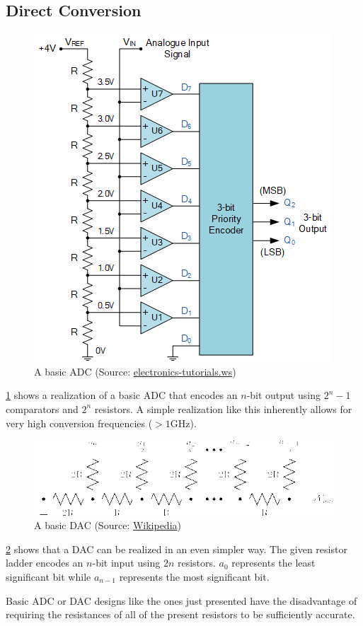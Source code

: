\documentclass{report}
\newcommand*{\newpar}{\par\vspace{\baselineskip}\noindent} %
\begin{document}
\subsection{Direct Conversion}
\begin{figure}[h!]
\centering
\includegraphics[scale=2]{figures/ADC}
\caption{A basic ADC (Source: \href{https://www.electronics-tutorials.ws/combination/analogue-to-digital-converter.html}{electronics-tutorials.ws})}
\label{fig:ADC}
\end{figure}
\ref{fig:ADC} shows a realization of a basic ADC that encodes an $n$-bit output using $2^n - 1$ comparators and $2^n$ resistors. A simple realization like this inherently allows for very high conversion frequencies ($> 1$GHz).
\begin{figure}[h!]
\centering
\includegraphics[scale=0.5]{figures/DAC}
\caption{A basic DAC (Source: \href{https://en.wikipedia.org/wiki/File:R2r-ladder.png}{Wikipedia})}
\label{fig:DAC}
\end{figure}
\newpar
\ref{fig:DAC} shows that a DAC can be realized in an even simpler way. The given resistor ladder  encodes an $n$-bit input using $2n$ resistors. $a_0$ represents the least significant bit while $a_{n-1}$ represents the most significant bit.
\newpar
Basic ADC or DAC designs like the ones just presented have the disadvantage of requiring the resistances of all of the present resistors to be sufficiently accurate.
\end{document}
